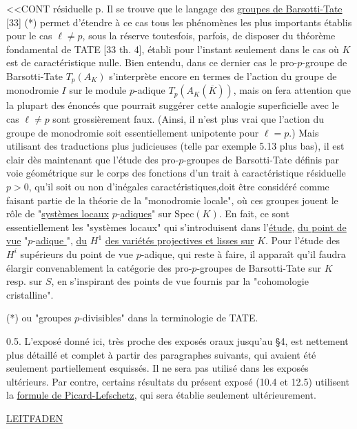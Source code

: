 <<CONT résiduelle p. Il se trouve que le langage des \underline{groupes de Barsotti-Tate} [33] (*) permet d'étendre à ce cas tous les phénomènes les plus importants établis pour le cas $\ell \neq p$, sous la réserve toutesfois, parfois, de disposer du théorème fondamental de TATE [33 th. 4], établi pour l'instant seulement dans le cas où $K$ est de caractéristique nulle. Bien entendu, dans ce dernier cas le pro-$p$-groupe de Barsotti-Tate $T_p(A_K)$ s'interprète encore en termes de l'action du groupe de monodromie $I$ sur le module $p$-adique $T_p(A_K(\overline{K}))$, mais on fera attention que la plupart des énoncés que pourrait suggérer cette analogie superficielle avec le cas $\ell \neq p$ sont grossièrement faux. (Ainsi, il n'est plus vrai que l'action du groupe de monodromie soit essentiellement unipotente pour $\ell = p$.) Mais utilisant des traductions plus judicieuses (telle par exemple 5.13 plus bas), il est clair dès maintenant que l'étude des pro-$p$-groupes de Barsotti-Tate définis par voie géométrique sur le corps des fonctions d'un trait à caractéristique résiduelle $p > 0$, qu'il soit ou non d'inégales caractéristiques,doit être considéré comme faisant partie de la théorie de la "monodromie locale", où ces groupes jouent le rôle de "\underline{systèmes locaux} $p$-\underline{adiques}" sur $\mathrm{Spec}(K)$. En fait, ce sont essentiellement les "systèmes locaux" qui s'introduisent dans l'\underline{étude}, \underline{du point de vue} "$p$-\underline{adique }", \underline{du} $H^1$ \underline{des variétés projectives et lisses sur} $K$. Pour l'étude des $H^i$ supérieurs du point de vue $p$-adique, qui reste à faire, il apparaît qu'il faudra élargir convenablement la catégorie des pro-$p$-groupes de Barsotti-Tate sur $K$ resp. sur $S$, en s'inspirant des points de vue fournis par la "cohomologie cristalline".

(*) ou "groupes $p$-divisibles" dans la terminologie de TATE.



0.5. L'exposé donné ici, très proche des exposés oraux jusqu'au \S 4, est nettement plus détaillé et complet à partir des paragraphes suivants, qui avaient été seulement partiellement esquissés. Il ne sera pas utilisé dans les exposés ultérieurs. Par contre, certains résultats du présent exposé (10.4 et 12.5) utilisent la \underline{formule de Picard-Lefschetz}, qui sera établie seulement ultérieurement.


\underline{LEITFADEN}

